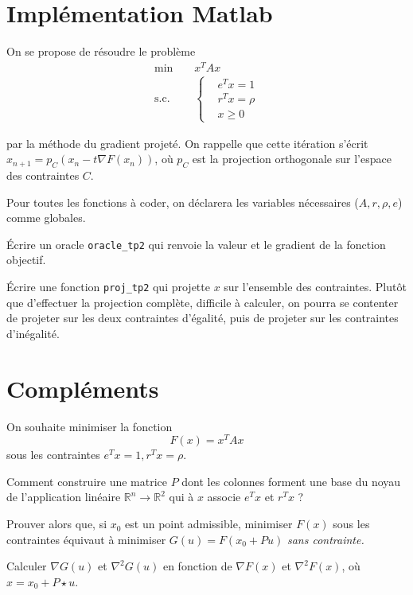 \documentclass[10pt,a4paper,fleqn]{report}
\newcommand{\R}{\mathbb R}
\newcommand{\grad}{\nabla}
\newcommand{\hess}{\nabla^2}
\newcommand{\on}{\begin{displaymath}}
\newcommand{\off}{\end{displaymath}}
\begin{document}
\section{Implémentation Matlab}
\begin{exercice}
  On se propose de résoudre le problème
\begin{align*}
  \text{min} \;\;\;\;&x^{T} A x\\
  \text{s.c.}\;\;\;\;&\begin{cases}
    &e^{T} x = 1\\
  &r^{T} x = \rho\\
  &x \geq 0
  \end{cases}
\end{align*}

par la méthode du gradient projeté. On rappelle que cette itération
s'écrit $x_{n+1} = p_{C}(x_{n} - t \nabla F(x_{n}))$, où $p_{C}$ est
la projection orthogonale sur l'espace des contraintes $C$.

Pour toutes les fonctions à coder,
on déclarera les variables nécessaires ($A, r, \rho, e$) comme
globales.
\begin{questions}
\item Écrire un oracle \verb+oracle_tp2+ qui renvoie la valeur et le
  gradient de la fonction objectif.
\item Écrire une fonction \verb+proj_tp2+ qui projette $x$ sur l'ensemble
  des contraintes. Plutôt que d'effectuer la projection complète,
  difficile à calculer, on pourra se contenter de projeter sur les
  deux contraintes d'égalité, puis de projeter sur les contraintes
  d'inégalité.
\end{questions}

\end{exercice}

\section{Compléments}
\begin{exercice}
On souhaite minimiser la fonction
\on F(x)=x^T A x \off
sous les contraintes $e^{T} x=1, r^{T}x = \rho$.
\begin{questions}
\item Comment construire une matrice $P$ dont les colonnes forment une
  base du noyau de l'application lin\'eaire $\R^{n} \to \R^{2}$ qui
  \`a $x$ associe $e^{T} x$ et $r^{T} x$ ?
\item Prouver alors que, si $x_{0}$ est un point admissible, minimiser
  $F(x)$ sous les contraintes \'equivaut \`a minimiser $G(u)=F(x_0+P
  u)$ \it sans \rm contrainte.
\item Calculer $\grad G(u)$ et $\hess G(u)$ en fonction de $\grad
  F(x)$ et $\hess F(x)$, o\`u $x=x_0 + P \star u$.
\end{questions}
\end{exercice}
\end{document}
